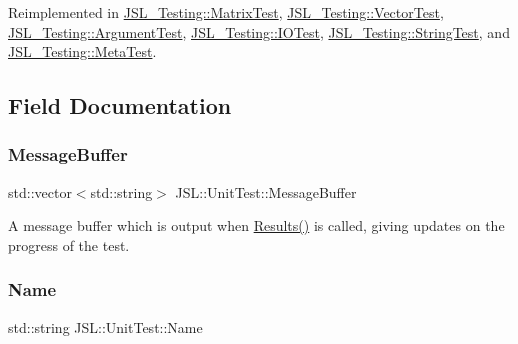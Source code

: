 Reimplemented in \hyperlink{classJSL__Testing_1_1MatrixTest_a8fe2a671faf414dbd13c407ab52b75fb}{J\+S\+L\+\_\+\+Testing\+::\+Matrix\+Test}, \hyperlink{classJSL__Testing_1_1VectorTest_ad79bb4654e6f7b59d31d7239ee0c2b82}{J\+S\+L\+\_\+\+Testing\+::\+Vector\+Test}, \hyperlink{classJSL__Testing_1_1ArgumentTest_a1c4c626d57e448da86866ef414308e97}{J\+S\+L\+\_\+\+Testing\+::\+Argument\+Test}, \hyperlink{classJSL__Testing_1_1IOTest_a85daecacc71354b5dc0dee36840b8704}{J\+S\+L\+\_\+\+Testing\+::\+I\+O\+Test}, \hyperlink{classJSL__Testing_1_1StringTest_ada0409cd10e3f09788994a9115331ff7}{J\+S\+L\+\_\+\+Testing\+::\+String\+Test}, and \hyperlink{classJSL__Testing_1_1MetaTest_a176352dcd54f9ec7df8f1548882e6820}{J\+S\+L\+\_\+\+Testing\+::\+Meta\+Test}.



\subsection{Field Documentation}
\mbox{\label{classJSL_1_1UnitTest_a3dcc71e7e8f72f0f07b8fc552b777ad8}} 
\subsubsection{\texorpdfstring{Message\+Buffer}{MessageBuffer}}
{\footnotesize\ttfamily std\+::vector$<$std\+::string$>$ J\+S\+L\+::\+Unit\+Test\+::\+Message\+Buffer}



A message buffer which is output when \hyperlink{classJSL_1_1UnitTest_a39e1076dd985334ce21606ae2a383f70}{Results()} is called, giving updates on the progress of the test. 

\mbox{\label{classJSL_1_1UnitTest_a53c19424147e72fa6392470627f15049}} 
\subsubsection{\texorpdfstring{Name}{Name}}
{\footnotesize\ttfamily std\+::string J\+S\+L\+::\+Unit\+Test\+::\+Name}



